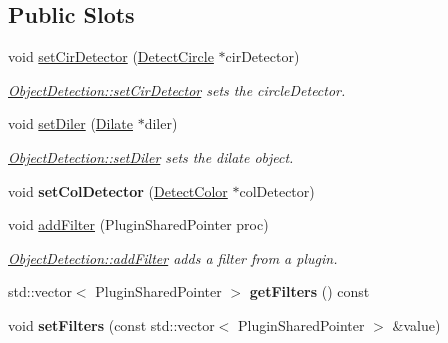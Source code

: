 \subsection*{Public Slots}
\begin{DoxyCompactItemize}
\item 
void \hyperlink{class_image_processor_1_1_object_detection_afb439c3f4c9bb2e084674ce34e965430}{set\+Cir\+Detector} (\hyperlink{class_image_processor_1_1_detect_circle}{Detect\+Circle} $\ast$cir\+Detector)
\begin{DoxyCompactList}\small\item\em \hyperlink{class_image_processor_1_1_object_detection_afb439c3f4c9bb2e084674ce34e965430}{Object\+Detection\+::set\+Cir\+Detector} sets the circle\+Detector. \end{DoxyCompactList}\item 
void \hyperlink{class_image_processor_1_1_object_detection_a727fcf4d318c9a3ccb63348b957c1e94}{set\+Diler} (\hyperlink{class_image_processor_1_1_dilate}{Dilate} $\ast$diler)
\begin{DoxyCompactList}\small\item\em \hyperlink{class_image_processor_1_1_object_detection_a727fcf4d318c9a3ccb63348b957c1e94}{Object\+Detection\+::set\+Diler} sets the dilate object. \end{DoxyCompactList}\item 
\mbox{\label{class_image_processor_1_1_object_detection_abb46bcf3c33130babf9508cb34b08bdf}} 
void {\bfseries set\+Col\+Detector} (\hyperlink{class_image_processor_1_1_detect_color}{Detect\+Color} $\ast$col\+Detector)
\item 
void \hyperlink{class_image_processor_1_1_object_detection_a494ede82feb2611a4c3e610e45472b78}{add\+Filter} (Plugin\+Shared\+Pointer proc)
\begin{DoxyCompactList}\small\item\em \hyperlink{class_image_processor_1_1_object_detection_a494ede82feb2611a4c3e610e45472b78}{Object\+Detection\+::add\+Filter} adds a filter from a plugin. \end{DoxyCompactList}\item 
\mbox{\label{class_image_processor_1_1_object_detection_ae96f26a784103d2542f5b4b7a19cad7f}} 
std\+::vector$<$ Plugin\+Shared\+Pointer $>$ {\bfseries get\+Filters} () const
\item 
\mbox{\label{class_image_processor_1_1_object_detection_a16ef9b01c8e0b9616ff410ff5fed7207}} 
void {\bfseries set\+Filters} (const std\+::vector$<$ Plugin\+Shared\+Pointer $>$ \&value)
\end{DoxyCompactItemize}
